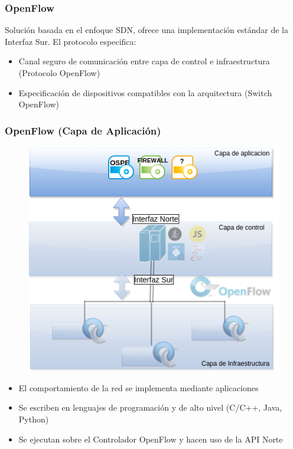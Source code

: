 \documentclass{beamer}
\begin{document}
\begin{frame}
\frametitle{OpenFlow} 

Soluci\'on basada en el enfoque SDN, ofrece una implementaci\'on est\'andar de la Interfaz Sur. El protocolo especifica:

\begin{itemize}
\item Canal seguro de comunicaci\'on entre capa de control e infraestructura (Protocolo OpenFlow)
\item Especificaci\'on de dispositivos compatibles con la arquitectura (Switch OpenFlow)
\end{itemize}


\end{frame}

\begin{frame}
\frametitle{OpenFlow (Capa de Aplicaci\'on)} 

\begin{minipage}{0.40\textwidth}
	\begin{figure}[H]
		\centering
		\includegraphics[width=1.0\textwidth]{imagenes/openflowApplication.png}
	\end{figure}

\end{minipage}
\hfill
\begin{minipage}{0.58\textwidth}

\begin{itemize}
\item El comportamiento de la red se implementa mediante aplicaciones
\item Se escriben en lenguajes de programaci\'on y de alto nivel (C/C++, Java, Python)
\item Se ejecutan sobre el Controlador OpenFlow y hacen uso de la API Norte
\end{itemize}

\end{minipage}

\end{frame}
\end{document}
